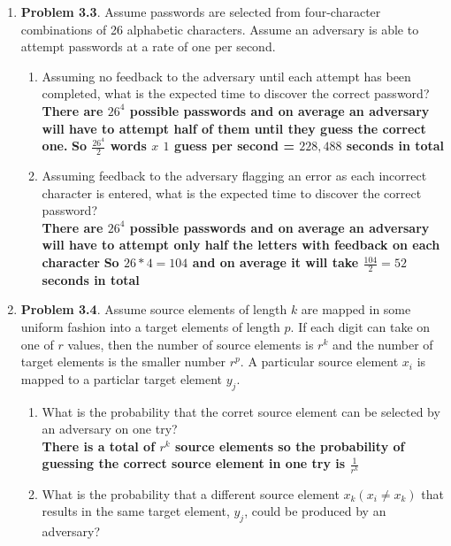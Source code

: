 \documentclass[12pt]{article}
\begin{document}
\begin{enumerate}
\item{\textbf{Problem 3.3}. Assume passwords are selected from four-character combinations of 26 alphabetic characters. Assume an adversary is able to attempt passwords at a rate of one per second.}
  \begin{enumerate}
    \item Assuming no feedback to the adversary until each attempt has been completed, what is the expected time to discover the correct password? \\

    \textbf{There are $26^4$ possible passwords and on average an adversary will have to attempt half of them until they guess the correct one.}
    \textbf{So $\frac{26^4}{2}$ words $x$ $1$ guess per second = $228,488$ seconds in total}

    \item Assuming feedback to the adversary flagging an error as each incorrect character is entered, what is the expected time to discover the correct password? \\

    \textbf{There are $26^4$ possible passwords and on average an adversary will have to attempt only half the letters with feedback on each character}
    \textbf{So $26 * 4 = 104$ and on average it will take $\frac{104}{2} = 52$ seconds in total}
  \end{enumerate}

\item{\textbf{Problem 3.4}. Assume source elements of length $k$ are mapped in some uniform fashion into a target elements of length $p$. If each digit can take on one of $r$ values, then the number of source elements is $r^k$ and the number of target elements is the smaller number $r^p$. A particular source element $x_i$ is mapped to a particlar target element $y_j$. }
  \begin{enumerate}
    \item What is the probability that the corret source element can be selected by an adversary on one try? \\

    \textbf{There is a total of $r^k$ source elements so the probability of guessing the correct source element in one try is $\frac{1}{r^k}$} \\

    \item What is the probability that a different source element $x_k (x_i \neq x_k)$ that results in the same target element, $y_j$, could be produced by an adversary? \\


\end{enumerate}
\end{enumerate}
\end{document}
